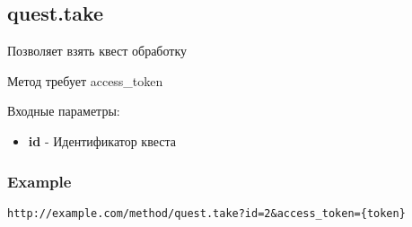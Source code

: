 \subsection{quest.take}
Позволяет взять квест обработку

Метод требует access\_token

Входные параметры:
\begin{itemize}
  \item \textbf{id} - Идентификатор квеста
\end{itemize}

\subsubsection{Example}
\begin{Verbatim}[frame=single]
http://example.com/method/quest.take?id=2&access_token={token}
\end{Verbatim}